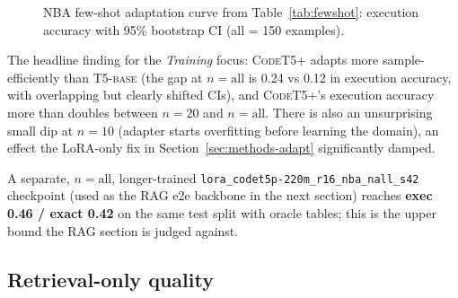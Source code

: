 \documentclass[11pt,a4paper]{article}
\newcommand{\codet}{\textsc{CodeT5+}}
\newcommand{\tfive}{\textsc{T5-base}}
\newcommand{\bestckpt}{\texttt{lora\_codet5p-220m\_r16\_nba\_nall\_s42}}
\begin{document}
\begin{figure}[h]
\centering
{}
\caption{NBA few-shot adaptation curve from Table~\ref{tab:fewshot}: execution accuracy with 95\% bootstrap CI (all = 150 examples).}
\label{fig:fewshot-exec-ci}
\end{figure}

The headline finding for the \emph{Training} focus: \codet{} adapts more
sample-efficiently than \tfive{} (the gap at $n{=}\text{all}$ is 0.24 vs 0.12
in execution accuracy, with overlapping but clearly shifted CIs), and
\codet{}'s execution accuracy more than doubles between $n{=}20$ and
$n{=}\text{all}$. There is also an unsurprising small dip at $n{=}10$
(adapter starts overfitting before learning the domain), an effect the
LoRA-only fix in Section~\ref{sec:methods-adapt} significantly damped.

A separate, $n{=}\text{all}$, longer-trained \bestckpt{} checkpoint (used as
the RAG e2e backbone in the next section) reaches \textbf{exec 0.46 / exact
0.42} on the same test split with oracle tables; this is the upper bound the
RAG section is judged against.

\subsection{Retrieval-only quality}
\label{sec:rag-retrieval}
\end{document}

